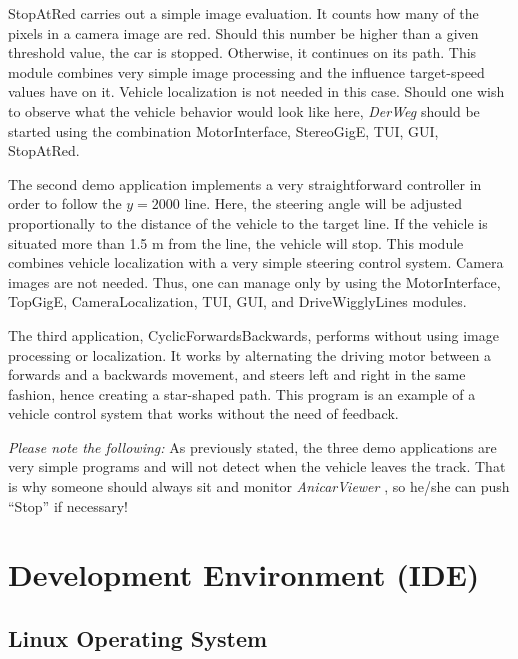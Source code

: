\documentclass[a4paper, 11pt]{article}
\newcommand{\DerWeg}{\textit{DerWeg }} %
\newcommand{\AnicarViewer}{\textit{AnicarViewer }} %
\begin{document}
StopAtRed carries out a simple image evaluation. It counts how many of the pixels in a camera image are red. Should this number be higher than a given threshold value, the car is stopped. Otherwise, it continues on its path. This module combines very simple image processing  and the influence target-speed values have on it. Vehicle localization is not needed in this case. Should one wish to observe what the vehicle behavior would look like here, \DerWeg should be started using the combination MotorInterface, StereoGigE, TUI, GUI, StopAtRed.


The second demo application implements a very straightforward controller in order to follow the $y=2000$ line. Here, the steering angle will be adjusted proportionally to the distance of the vehicle to the target line. If the vehicle is situated more than 1.5 m from the line, the vehicle will stop. This module combines vehicle localization with a very simple steering control system. Camera images are not needed. Thus, one can manage only by using the MotorInterface, TopGigE, CameraLocalization, TUI, GUI, and DriveWigglyLines modules.

The third application, CyclicForwardsBackwards, performs without using image processing or localization. It works by alternating the driving motor between a forwards and a backwards movement, and steers left and right in the same fashion, hence creating a star-shaped path. This program is an example of a vehicle control system that works without the need of feedback.

\textit{Please note the following:} As previously stated, the three demo applications are very simple programs and will not detect when the vehicle leaves the track. That is why someone should always sit and monitor \AnicarViewer, so he/she can push "`Stop"' if necessary!

\section{Development Environment (IDE)}

\subsection{Linux Operating System}
\end{document}
